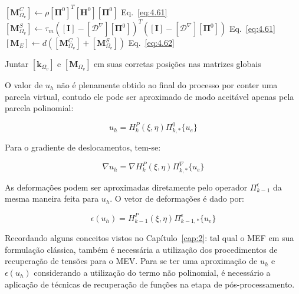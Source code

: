 \begin{algorithm}[htpb!]
\begin{algorithmic}[1]
            \State $[\mathbf{M}_{\Omega_v}^C] \leftarrow \rho [\mathbf{\Pi}^{0}]^T [\mathbf{H}^{0}] [\mathbf{\Pi}^{0}]$ \hfill Eq.~\ref{eq:4.61}
            \State $[\mathbf{M}_{\Omega_v}^S] \leftarrow \tau_m ([\mathbf{I}] - [\mathcal{D}^{\nabla}][\mathbf{\Pi}^{0}])^T ([\mathbf{I}] - [\mathcal{D}^{\nabla}][\mathbf{\Pi}^{0}])$ \hfill Eq.~\ref{eq:4.61}
            \State $[\mathbf{M}_E] \leftarrow d \left( [\mathbf{M}_{\Omega_v}^C] + [\mathbf{M}_{\Omega_v}^S] \right)$ \hfill Eq.~\ref{eq:4.62}
    
            \State Juntar $[\mathbf{k}_{\Omega_v}]$ e $[\mathbf{M}_{\Omega_v}]$ em suas corretas posições nas matrizes globais 
        \EndWhile
        \end{algorithmic}
    \end{algorithm}

    \indent O valor de $u_h$ não é plenamente obtido ao final do processo por conter uma parcela virtual, contudo ele pode ser aproximado de modo aceitável apenas pela parcela polinomial: 

    \begin{equation}
        u_h = H_k^P (\xi,\eta) \Pi_{k,*}^0 \{u_e\} 
        \label{eq:4.69}
    \end{equation}

    \indent Para o gradiente de deslocamentos, tem-se: 

    \begin{equation}
        \nabla u_h = \nabla H_k^P (\xi,\eta) \Pi_{k,*}^{\nabla} \{u_e\} 
        \label{eq:4.70}
    \end{equation}

    \indent As deformações podem ser aproximadas diretamente pelo operador $\Pi_{k-1}^{\epsilon}$ da mesma maneira feita para $u_h$. O vetor de deformações é dado por: 
    
    \begin{equation}
        \epsilon(u_h) = H_{k-1}^P (\xi,\eta) \Pi_{k-1,*}^{\epsilon} \{u_e\}
        \label{eq:4.71}
    \end{equation}

    \indent Recordando alguns conceitos vistos no Capítulo~\ref{cap:2}: tal qual o MEF em sua formulação clássica, também é necessária a utilização dos procedimentos de recuperação de tensões para o MEV. Para se ter uma aproximação de $u_h$ e $\epsilon(u_h)$ considerando a utilização do termo não polinomial, é necessário a aplicação de técnicas de recuperação de funções na etapa de pós-processamento.

    






















